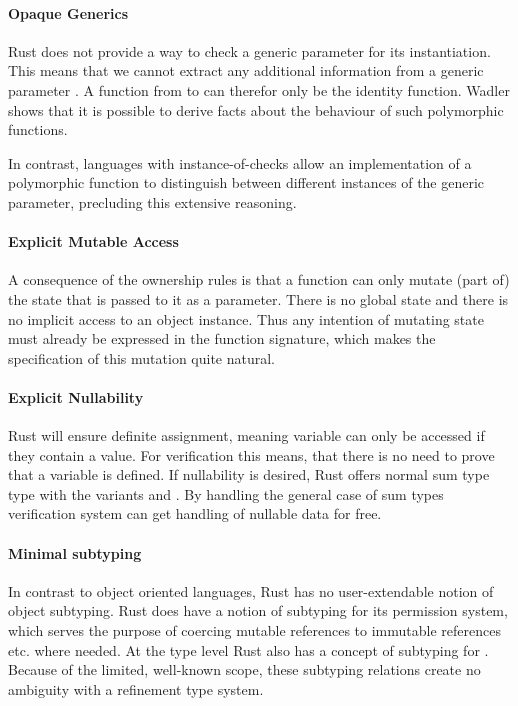 \documentclass[twoside, english]{sdqthesis}
\theoremstyle{definition}
\begin{document}
\paragraph*{Opaque Generics} Rust does not provide a way to check a generic parameter for its instantiation. This means that we cannot extract any additional information from a generic parameter . A function from  to  can therefor only be the identity function.
Wadler \cite{wadler_theorems_1989} shows that it is possible to derive facts about the behaviour of such polymorphic functions.

In contrast, languages with instance-of-checks allow an implementation of a polymorphic function to distinguish between different instances of the generic parameter, precluding this extensive reasoning.

\paragraph*{Explicit Mutable Access} A consequence of the ownership rules is that a function can only mutate (part of) the state that is passed to it as a parameter. There is no global state and there is no implicit access to an object instance. Thus any intention of mutating state must already be expressed in the function signature, which makes the specification of this mutation quite natural.

\paragraph*{Explicit Nullability} Rust will ensure definite assignment, meaning variable can only be accessed if they contain a value. For verification this means, that there is no need to prove that a variable is defined. If nullability is desired, Rust offers normal sum type  type with the variants  and . 
By handling the general case of sum types verification system can get handling of nullable data for free.

\paragraph*{Minimal subtyping} In contrast to object oriented languages, Rust has no user-extendable notion of object subtyping. 
Rust does have a notion of subtyping for its permission system, which serves the purpose of coercing mutable references  to immutable references  etc. where needed. 
At the type level Rust also has a concept of subtyping for .
Because of the limited, well-known scope, these subtyping relations create no ambiguity with a refinement type system.
\end{document}
